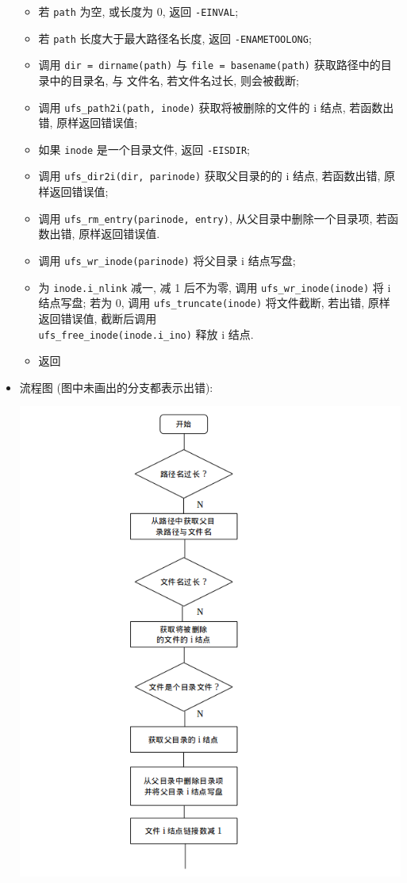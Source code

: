 \documentclass[nofonts]{ctexart}
\begin{document}
\begin{itemize}
  \begin{itemize}
  \item
    若 \texttt{path} 为空, 或长度为 0, 返回 \texttt{-EINVAL};
  \item
    若 \texttt{path} 长度大于最大路径名长度, 返回
    \texttt{-ENAMETOOLONG};
  \item
    调用 \texttt{dir = dirname(path)} 与 \texttt{file = basename(path)}
    获取路径中的目录中的目录名, 与 文件名, 若文件名过长, 则会被截断;
  \item
    调用 \texttt{ufs\_path2i(path, inode)} 获取将被删除的文件的 i 结点,
    若函数出错, 原样返回错误值;
  \item
    如果 \texttt{inode} 是一个目录文件, 返回 \texttt{-EISDIR};
  \item
    调用 \texttt{ufs\_dir2i(dir, parinode)} 获取父目录的的 i 结点,
    若函数出错, 原样返回错误值;
  \item
    调用 \texttt{ufs\_rm\_entry(parinode, entry)},
    从父目录中删除一个目录项, 若函数出错, 原样返回错误值.
  \item
    调用 \texttt{ufs\_wr\_inode(parinode)} 将父目录 i 结点写盘;
  \item
    为 \texttt{inode.i\_nlink} 减一, 减 1 后不为零, 调用
    \texttt{ufs\_wr\_inode(inode)} 将 i 结点写盘; 若为 0, 调用
    \texttt{ufs\_truncate(inode)} 将文件截断, 若出错, 原样返回错误值,
    截断后调用 \\
    \texttt{ufs\_free\_inode(inode.i\_ino)} 释放 i 结点.
  \item
    返回
  \end{itemize}
\item
  流程图
  (图中未画出的分支都表示出错):

  \includegraphics[width=15cm]{./images/./unlink_1.png}


\end{itemize}
\end{document}
